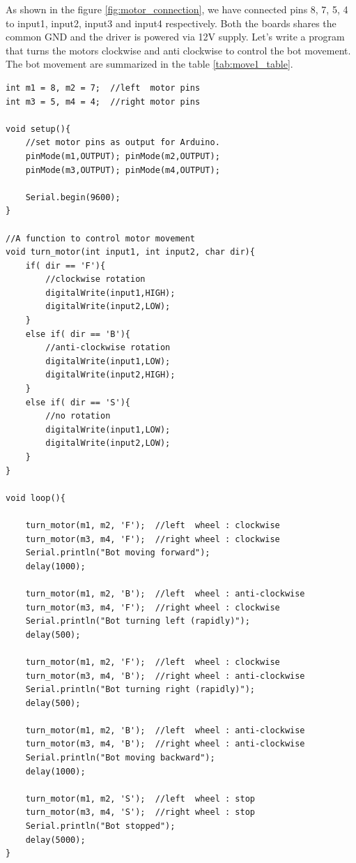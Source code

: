 As shown in the figure \ref{fig:motor_connection}, we have connected pins 8, 7, 5, 4 to input1, input2, input3 and input4 respectively. Both the boards shares the common GND and the driver is powered via 12V supply. Let’s write a program that turns the motors clockwise and anti clockwise to control the bot movement. The bot movement are summarized in the table \ref{tab:move1_table}.

\begin{lstlisting}[style=CStyle]
int m1 = 8, m2 = 7;  //left  motor pins
int m3 = 5, m4 = 4;  //right motor pins

void setup(){
    //set motor pins as output for Arduino.
    pinMode(m1,OUTPUT); pinMode(m2,OUTPUT);
    pinMode(m3,OUTPUT); pinMode(m4,OUTPUT);
    
    Serial.begin(9600);
}

//A function to control motor movement
void turn_motor(int input1, int input2, char dir){
    if( dir == 'F'){
        //clockwise rotation
        digitalWrite(input1,HIGH);
        digitalWrite(input2,LOW);
    }
    else if( dir == 'B'){
        //anti-clockwise rotation
        digitalWrite(input1,LOW);
        digitalWrite(input2,HIGH);
    }
    else if( dir == 'S'){
        //no rotation
        digitalWrite(input1,LOW);
        digitalWrite(input2,LOW);
    }
}

void loop(){

    turn_motor(m1, m2, 'F');  //left  wheel : clockwise
    turn_motor(m3, m4, 'F');  //right wheel : clockwise
    Serial.println("Bot moving forward");
    delay(1000);
    
    turn_motor(m1, m2, 'B');  //left  wheel : anti-clockwise
    turn_motor(m3, m4, 'F');  //right wheel : clockwise
    Serial.println("Bot turning left (rapidly)");
    delay(500);
    
    turn_motor(m1, m2, 'F');  //left  wheel : clockwise
    turn_motor(m3, m4, 'B');  //right wheel : anti-clockwise
    Serial.println("Bot turning right (rapidly)");
    delay(500);
    
    turn_motor(m1, m2, 'B');  //left  wheel : anti-clockwise
    turn_motor(m3, m4, 'B');  //right wheel : anti-clockwise
    Serial.println("Bot moving backward");
    delay(1000);
    
    turn_motor(m1, m2, 'S');  //left  wheel : stop
    turn_motor(m3, m4, 'S');  //right wheel : stop
    Serial.println("Bot stopped");
    delay(5000);
}
\end{lstlisting}

